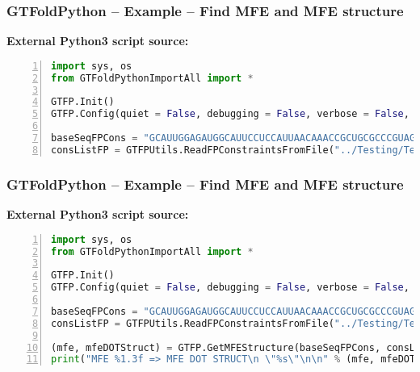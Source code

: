 \documentclass[usenames,svgnames,dvipsnames,11pt]{beamer}
\begin{document}
\begin{frame}[t,fragile]
\frametitle{GTFoldPython -- Example -- Find MFE and MFE structure}

\small\noindent
\textbf{External Python3 script source:}
\begin{lstlisting}[language=Python,basicstyle=\tiny\ttfamily,keywordstyle=\bfseries\color{green!40!black},
                   commentstyle=\itshape\color{purple!40!black},identifierstyle=\color{blue!63!green},
                   stringstyle=\color{orange},frame=none,keepspaces=true,numbers=left,xleftmargin=0.28cm]
import sys, os
from GTFoldPythonImportAll import *

GTFP.Init()
GTFP.Config(quiet = False, debugging = False, verbose = False, stdmsgout = "stderr")

baseSeqFPCons = "GCAUUGGAGAUGGCAUUCCUCCAUUAACAAACCGCUGCGCCCGUAGCAGCUGAUGAUGCCUACAGA"
consListFP = GTFPUtils.ReadFPConstraintsFromFile("../Testing/TestData/tRNA/yeast.fa.cons")
\end{lstlisting}

\end{frame}

\begin{frame}[t,fragile]
\frametitle{GTFoldPython -- Example -- Find MFE and MFE structure}

\small\noindent
\textbf{External Python3 script source:}
\begin{lstlisting}[language=Python,basicstyle=\tiny\ttfamily,keywordstyle=\bfseries\color{green!40!black},
                   commentstyle=\itshape\color{purple!40!black},identifierstyle=\color{blue!63!green},
                   stringstyle=\color{orange},frame=none,keepspaces=true,numbers=left,xleftmargin=0.28cm]
import sys, os
from GTFoldPythonImportAll import *

GTFP.Init()
GTFP.Config(quiet = False, debugging = False, verbose = False, stdmsgout = "stderr")

baseSeqFPCons = "GCAUUGGAGAUGGCAUUCCUCCAUUAACAAACCGCUGCGCCCGUAGCAGCUGAUGAUGCCUACAGA"
consListFP = GTFPUtils.ReadFPConstraintsFromFile("../Testing/TestData/tRNA/yeast.fa.cons")

(mfe, mfeDOTStruct) = GTFP.GetMFEStructure(baseSeqFPCons, consListFP)
print("MFE %1.3f => MFE DOT STRUCT\n \"%s\"\n\n" % (mfe, mfeDOTStruct))
\end{lstlisting}

\end{frame}
\end{document}

